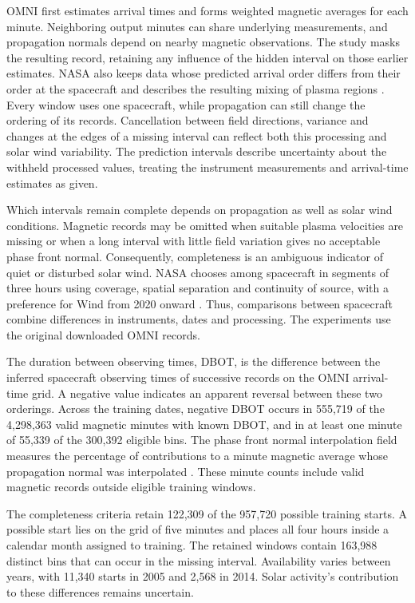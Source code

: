 \documentclass{article}
\begin{document}
OMNI first estimates arrival times and forms weighted magnetic averages for each minute. Neighboring output minutes can share underlying measurements, and propagation normals depend on nearby magnetic observations. The study masks the resulting record, retaining any influence of the hidden interval on those earlier estimates. NASA also keeps data whose predicted arrival order differs from their order at the spacecraft and describes the resulting mixing of plasma regions \citep[Sections 3a--3c and Appendix 5]{papitashvili2020omni}. Every window uses one spacecraft, while propagation can still change the ordering of its records. Cancellation between field directions, variance and changes at the edges of a missing interval can reflect both this processing and solar wind variability. The prediction intervals describe uncertainty about the withheld processed values, treating the instrument measurements and arrival-time estimates as given.

Which intervals remain complete depends on propagation as well as solar wind conditions. Magnetic records may be omitted when suitable plasma velocities are missing or when a long interval with little field variation gives no acceptable phase front normal. Consequently, completeness is an ambiguous indicator of quiet or disturbed solar wind. NASA chooses among spacecraft in segments of three hours using coverage, spatial separation and continuity of source, with a preference for Wind from 2020 onward \citep[Appendix 6]{papitashvili2020omni}. Thus, comparisons between spacecraft combine differences in instruments, dates and processing. The experiments use the original downloaded OMNI records.

The duration between observing times, DBOT, is the difference between the inferred spacecraft observing times of successive records on the OMNI arrival-time grid. A negative value indicates an apparent reversal between these two orderings. Across the training dates, negative DBOT occurs in 555{,}719 of the 4{,}298{,}363 valid magnetic minutes with known DBOT, and in at least one minute of 55{,}339 of the 300{,}392 eligible bins. The phase front normal interpolation field measures the percentage of contributions to a minute magnetic average whose propagation normal was interpolated \citep{nasamodifiedomni}. These minute counts include valid magnetic records outside eligible training windows.

The completeness criteria retain 122{,}309 of the 957{,}720 possible training starts. A possible start lies on the grid of five minutes and places all four hours inside a calendar month assigned to training. The retained windows contain 163{,}988 distinct bins that can occur in the missing interval. Availability varies between years, with 11{,}340 starts in 2005 and 2{,}568 in 2014. Solar activity's contribution to these differences remains uncertain.
\end{document}

